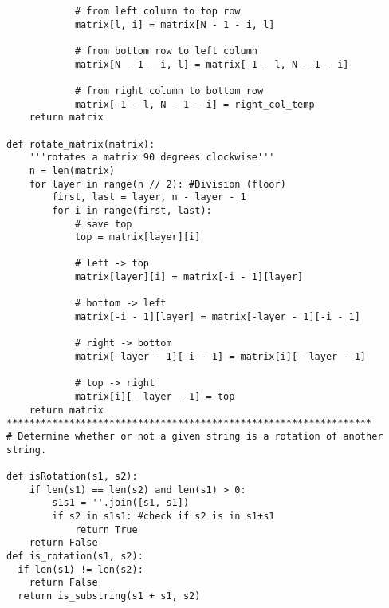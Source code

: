 \documentclass[12pt]{article}
\begin{document}
\begin{lstlisting}
            # from left column to top row
            matrix[l, i] = matrix[N - 1 - i, l]

            # from bottom row to left column
            matrix[N - 1 - i, l] = matrix[-1 - l, N - 1 - i]

            # from right column to bottom row
            matrix[-1 - l, N - 1 - i] = right_col_temp
    return matrix

def rotate_matrix(matrix):
    '''rotates a matrix 90 degrees clockwise'''
    n = len(matrix)
    for layer in range(n // 2): #Division (floor)
        first, last = layer, n - layer - 1
        for i in range(first, last):
            # save top
            top = matrix[layer][i]

            # left -> top
            matrix[layer][i] = matrix[-i - 1][layer]

            # bottom -> left
            matrix[-i - 1][layer] = matrix[-layer - 1][-i - 1]

            # right -> bottom
            matrix[-layer - 1][-i - 1] = matrix[i][- layer - 1]

            # top -> right
            matrix[i][- layer - 1] = top
    return matrix
****************************************************************
# Determine whether or not a given string is a rotation of another string.

def isRotation(s1, s2):
    if len(s1) == len(s2) and len(s1) > 0:
        s1s1 = ''.join([s1, s1])
        if s2 in s1s1: #check if s2 is in s1+s1
            return True
    return False
def is_rotation(s1, s2):
  if len(s1) != len(s2):
    return False
  return is_substring(s1 + s1, s2)
  

\end{lstlisting}
\end{document}
